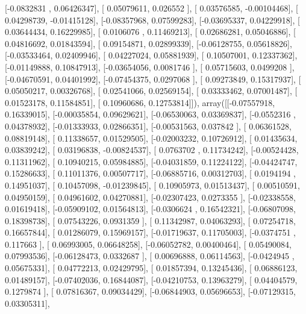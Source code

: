 \documentclass{article}
\begin{document}
       [-0.0832831 ,  0.06426347],
       [ 0.05079611,  0.026552  ],
       [ 0.03576585, -0.00104468],
       [ 0.04298739, -0.01415128],
       [-0.08357968,  0.07599283],
       [-0.03695337,  0.04229918],
       [ 0.03644434,  0.16229985],
       [ 0.0106076 ,  0.11469213],
       [ 0.02686281,  0.05046886],
       [ 0.04816692,  0.01843594],
       [ 0.09154871,  0.02899339],
       [-0.06128755,  0.05618826],
       [-0.03533464,  0.02409946],
       [ 0.04227024,  0.05881939],
       [ 0.10507001,  0.12337362],
       [-0.01149888,  0.10847913],
       [-0.03654056,  0.0081746 ],
       [ 0.05715603,  0.0499208 ],
       [-0.04670591,  0.04401992],
       [-0.07454375,  0.0297068 ],
       [ 0.09273849,  0.15317937],
       [ 0.05050217,  0.00326768],
       [ 0.02541066,  0.02569154],
       [ 0.03333462,  0.07001487],
       [ 0.01523178,  0.11584851],
       [ 0.10960686,  0.12753814]]), array([[-0.07557918,  0.16339015],
       [-0.00035854,  0.09629621],
       [-0.06530063,  0.03369837],
       [-0.0552316 ,  0.04378932],
       [-0.01333933,  0.02866351],
       [-0.00531563,  0.037842  ],
       [ 0.06361528,  0.08819148],
       [ 0.11338657,  0.01529505],
       [-0.02003232,  0.10726912],
       [ 0.01435634,  0.03839242],
       [ 0.03196838, -0.00824537],
       [ 0.0763702 ,  0.11734242],
       [-0.00524428,  0.11311962],
       [ 0.10940215,  0.05984885],
       [-0.04031859,  0.11224122],
       [-0.04424747,  0.15286633],
       [ 0.11011376,  0.00507717],
       [-0.06885716,  0.00312703],
       [ 0.0194194 ,  0.14951037],
       [ 0.10457098, -0.01239845],
       [ 0.10905973,  0.01513437],
       [ 0.00510591,  0.04950159],
       [ 0.04961602,  0.04270881],
       [-0.02307423,  0.0273355 ],
       [-0.02338558,  0.01619418],
       [-0.05909102,  0.01564813],
       [-0.0306624 ,  0.16542321],
       [-0.06807098,  0.18398738],
       [ 0.07543226,  0.0931359 ],
       [ 0.11342987,  0.04063293],
       [ 0.07254718,  0.16657844],
       [ 0.01286079,  0.15969157],
       [-0.01719637,  0.11705003],
       [-0.0374751 ,  0.117663  ],
       [ 0.06993005,  0.06648258],
       [-0.06052782,  0.00400464],
       [ 0.05490084,  0.07993536],
       [-0.06128473,  0.0332687 ],
       [ 0.00696888,  0.06114563],
       [-0.0424945 ,  0.05675331],
       [ 0.04772213,  0.02429795],
       [ 0.01857394,  0.13245436],
       [ 0.06886123,  0.01489157],
       [-0.07402036,  0.16844087],
       [-0.04210753,  0.13963279],
       [ 0.04404579,  0.1279874 ],
       [ 0.07816367,  0.09034429],
       [-0.06844903,  0.05696653],
       [-0.07129315,  0.03305311],
\end{document}
